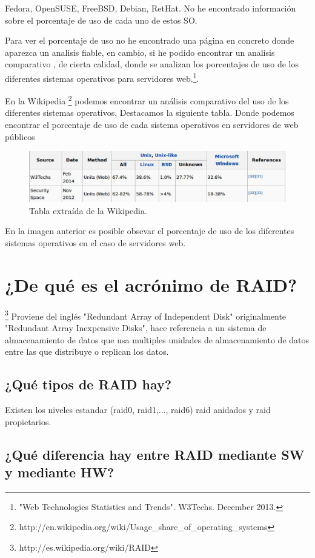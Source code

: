 Fedora, OpenSUSE, FreeBSD, Debian, RetHat. No he encontrado información sobre el porcentaje de uso de cada uno de estos SO.

Para ver el porcentaje de uso no he encontrado una página en concreto donde aparezca un analisis fiable, en cambio, si he podido encontrar un analisis comparativo , de cierta calidad, donde se analizan los porcentajes de uso de los diferentes sistemas operativos para servidores web.\footnote{ "Web Technologies Statistics and Trends". W3Techs. December 2013.}.

En la Wikipedia \footnote{http://en.wikipedia.org/wiki/Usage\_share\_of\_operating\_systems} podemos encontrar un análisis comparativo del uso de los diferentes sistemas operativos, Destacamos la siguiente tabla. Donde podemos encontrar el porcentaje de uso de cada sistema operativos en servidores de web públicos
\begin{figure}[H]
\begin{center}
\includegraphics[scale=0.4]{imagenes/cuestion7.eps}
\caption{ Tabla extraída de la Wikipedia.}
\end{center}
\end{figure}
En la imagen anterior es posible obsevar el porcentaje de uso de los diferentes sistemas operativos en el caso de servidores web.
\section{¿De qué es el acrónimo de RAID?}
\footnote{http://es.wikipedia.org/wiki/RAID}
Proviene del inglés "Redundant Array of Independent Disk" originalmente "Redundant Array Inexpensive Disks", hace referencia a un sistema de almacenamiento de datos que usa multiples unidades de almacenamiento de datos entre las que distribuye o replican los datos.

\subsection{¿Qué tipos de RAID hay?}
Existen los niveles estandar (raid0, raid1,..., raid6) raid anidados y raid propietarios.

\subsection{¿Qué diferencia hay entre RAID mediante SW y mediante HW?}

